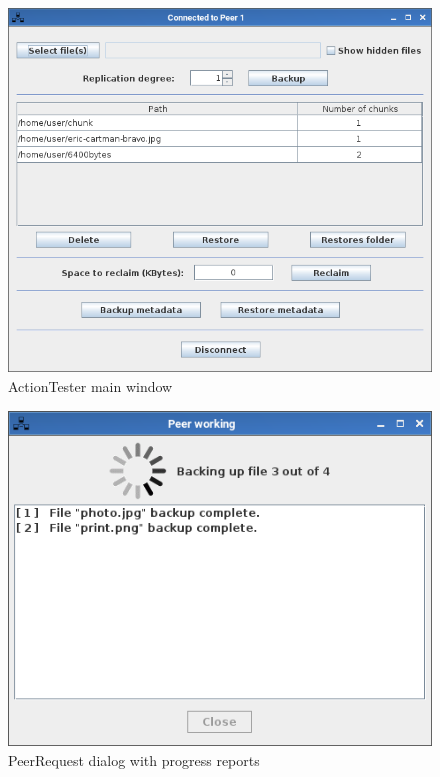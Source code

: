 \documentclass[a4paper,11pt]{article}
\begin{document}
\begin{figure}[h]
    \centering
    \includegraphics[scale=0.40]{ActionTester.png}
    \caption{ActionTester main window}
    \label{fig:ActionTester.png}
\end{figure}

\begin{figure}[h]
    \centering
    \includegraphics[scale=0.40]{PeerRequest.png}
    \caption{PeerRequest dialog with progress reports}
    \label{fig:PeerRequest.png}
\end{figure}
\end{document}
